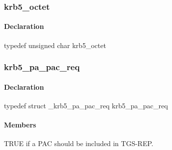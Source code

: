 \documentclass[letterpaper,10pt,english]{sphinxmanual}
\begin{document}
\subsubsection{krb5\_octet}
\label{appdev/refs/types/krb5_octet:krb5-octet-struct}\label{appdev/refs/types/krb5_octet:krb5-octet}\label{appdev/refs/types/krb5_octet::doc}

\begin{fulllineitems}
\label{appdev/refs/types/krb5_octet:krb5_octet}
\end{fulllineitems}



\paragraph{Declaration}
\label{appdev/refs/types/krb5_octet:declaration}
typedef unsigned char krb5\_octet


\subsubsection{krb5\_pa\_pac\_req}
\label{appdev/refs/types/krb5_pa_pac_req:krb5-pa-pac-req-struct}\label{appdev/refs/types/krb5_pa_pac_req::doc}\label{appdev/refs/types/krb5_pa_pac_req:krb5-pa-pac-req}

\begin{fulllineitems}
\label{appdev/refs/types/krb5_pa_pac_req:krb5_pa_pac_req}
\end{fulllineitems}



\paragraph{Declaration}
\label{appdev/refs/types/krb5_pa_pac_req:declaration}
typedef struct \_krb5\_pa\_pac\_req  krb5\_pa\_pac\_req


\paragraph{Members}
\label{appdev/refs/types/krb5_pa_pac_req:members}

\begin{fulllineitems}
\label{appdev/refs/types/krb5_pa_pac_req:krb5_pa_pac_req.include_pac}
TRUE if a PAC should be included in TGS-REP.

\end{fulllineitems}
\end{document}
